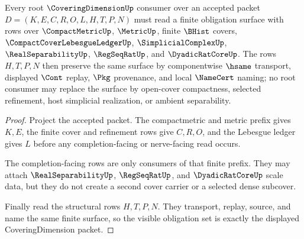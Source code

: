 \begin{theorem}
\label{thm:covering-dimension-root-obligation-surface}
Every root $\CoveringDimensionUp$ consumer over an accepted packet $D=(K,E,C,R,O,L,H,T,P,N)$ must read a finite obligation surface with rows over $\CompactMetricUp$, $\MetricUp$, finite $\BHist$ covers, $\CompactCoverLebesgueLedgerUp$, $\SimplicialComplexUp$, $\RealSeparabilityUp$, $\RegSeqRatUp$, and $\DyadicRatCoreUp$. The rows $H,T,P,N$ then preserve the same surface by componentwise $\hsame$ transport, displayed $\Cont$ replay, $\Pkg$ provenance, and local $\NameCert$ naming; no root consumer may replace the surface by open-cover compactness, selected refinement, host simplicial realization, or ambient separability.
\end{theorem}
\begin{proof}
Project the accepted packet. The compactmetric and metric prefix gives $K,E$, the finite cover and refinement rows give $C,R,O$, and the Lebesgue ledger gives $L$ before any completion-facing or nerve-facing read occurs.

The completion-facing rows are only consumers of that finite prefix. They may attach $\RealSeparabilityUp$, $\RegSeqRatUp$, and $\DyadicRatCoreUp$ scale data, but they do not create a second cover carrier or a selected dense subcover.

Finally read the structural rows $H,T,P,N$. They transport, replay, source, and name the same finite surface, so the visible obligation set is exactly the displayed CoveringDimension packet.
\end{proof}

